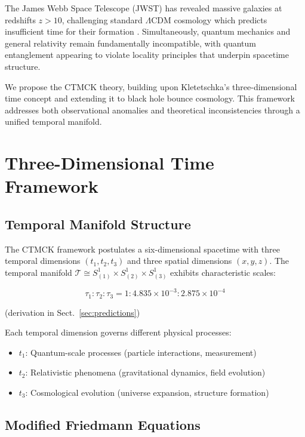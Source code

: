 \documentclass[reprint,amsmath,amssymb,aps,prd,nofootinbib]{revtex4-2}
\begin{document}
The James Webb Space Telescope (JWST) has revealed massive galaxies at redshifts $z > 10$, challenging standard $\Lambda$CDM cosmology which predicts insufficient time for their formation \cite{Naidu2022,Boylan-Kolchin2023}. Simultaneously, quantum mechanics and general relativity remain fundamentally incompatible, with quantum entanglement appearing to violate locality principles that underpin spacetime structure.

We propose the CTMCK theory, building upon Kletetschka's three-dimensional time concept \cite{Kletetschka2021} and extending it to black hole bounce cosmology. This framework addresses both observational anomalies and theoretical inconsistencies through a unified temporal manifold.

\section{Three-Dimensional Time Framework}\label{sec:framework}

\subsection{Temporal Manifold Structure}

The CTMCK framework postulates a six-dimensional spacetime with three temporal dimensions $(t_1,t_2,t_3)$ and three spatial dimensions $(x,y,z)$. The temporal manifold $\mathcal{T} \cong S^1_{(1)}\times S^1_{(2)}\times S^1_{(3)}$ exhibits characteristic scales:

\begin{equation}
\tau_1:\tau_2:\tau_3 = 1:4.835\times10^{-3}:2.875\times10^{-4}
\label{eq:temporal_scales}
\end{equation}

(derivation in Sect.~\ref{sec:predictions})

Each temporal dimension governs different physical processes:
\begin{itemize}
\item $t_1$: Quantum-scale processes (particle interactions, measurement)
\item $t_2$: Relativistic phenomena (gravitational dynamics, field evolution)  
\item $t_3$: Cosmological evolution (universe expansion, structure formation)
\end{itemize}

\subsection{Modified Friedmann Equations}
\end{document}
